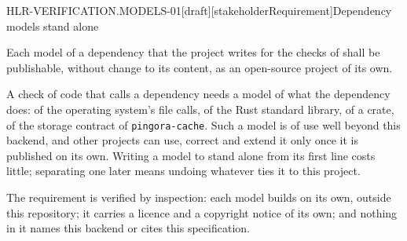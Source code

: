 \begin{requirement}{HLR-VERIFICATION.MODELS-01}[draft][stakeholderRequirement]{Dependency models stand alone}


  Each model of a dependency that the project writes for the checks of
   shall be publishable, without change
  to its content, as an open-source project of its own.

  A check of code that calls a dependency needs a model of what the
  dependency does: of the operating system's file calls, of the Rust standard
  library, of a crate, of the storage contract of \texttt{pingora-cache}.
  Such a model is of use well beyond this backend, and other projects can
  use, correct and extend it only once it is published on its own. Writing a
  model to stand alone from its first line costs little; separating one
  later means undoing whatever ties it to this project.

  The requirement is verified by inspection: each model builds on its own,
  outside this repository; it carries a licence and a copyright notice of its
  own; and nothing in it names this backend or cites this specification.


\end{requirement}
